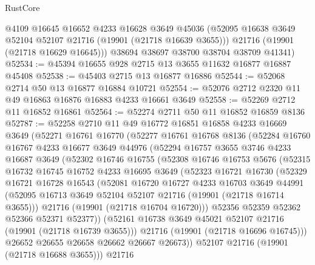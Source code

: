 \begin{lexlean}{RustCore}
\begin{coremodule}
        @4109
        @16645
        @16652
        @4233
        @16628
        @3649
        @45036
        (@52095 @16638 @3649 @52104 @52107 @21716 (@19901 (@21718 @16639 @3655)))
        @21716
        (@19901 (@21718 @16629 @16645)))
      @38694
      @38697
      @38700
      @38704
      @38709
      @41341)
@52534 := @45394 @16655 @928 @2715 @13 @3655 @11632 @16877 @16887 @45408
@52538 := @45403 @2715 @13 @16877 @16886
@52544 := @52068 @2714 @50 @13 @16877 @16884 @10721
@52554 := @52076 @2712 @2320 @11 @49 @16863 @16876 @16883 @4233 @16661 @3649
@52558 := @52269 @2712 @11 @16852 @16861
@52564 := @52274 @2711 @50 @11 @16852 @16859 @8136
@52787 := @52258
    @2710
    @11
    @49
    @16772
    @16851
    @16858
    @4233
    @16669
    @3649
    (@52271
      @16761
      @16770
      (@52277
        @16761
        @16768
        @8136
        (@52284
          @16760
          @16767
          @4233
          @16677
          @3649
          @44976
          (@52294
            @16757
            @3655
            @3746
            @4233
            @16687
            @3649
            (@52302
              @16746
              @16755
              (@52308
                @16746
                @16753
                @5676
                (@52315
                  @16732
                  @16745
                  @16752
                  @4233
                  @16695
                  @3649
                  (@52323
                    @16721
                    @16730
                    (@52329
                      @16721
                      @16728
                      @16543
                      (@52081
                        @16720
                        @16727
                        @4233
                        @16703
                        @3649
                        @44991
                        (@52095 @16713 @3649 @52104 @52107 @21716 (@19901 (@21718 @16714 @3655)))
                        @21716
                        (@19901 (@21718 @16704 @16720)))
                      @52356
                      @52359
                      @52362
                      @52366
                      @52371
                      @52377))
                  (@52161 @16738 @3649 @45021 @52107 @21716 (@19901 (@21718 @16739 @3655)))
                  @21716
                  (@19901 (@21718 @16696 @16745)))
                @26652
                @26655
                @26658
                @26662
                @26667
                @26673))
            @52107
            @21716
            (@19901 (@21718 @16688 @3655)))
          @21716

\end{coremodule}
\end{lexlean}
